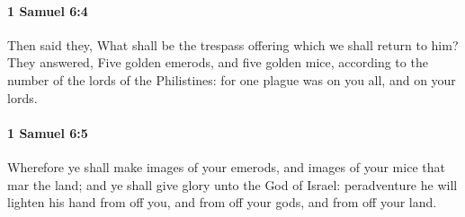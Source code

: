 		\paragraph{1 Samuel 6:4} %
			\label{1SAMUEL-6-4}

			Then said they, What shall be the trespass offering which we shall return to him? They answered, Five golden emerods, and five golden mice, according to the number of the lords of the Philistines: for one plague was on you all, and on your lords.


		\paragraph{1 Samuel 6:5} %
			\label{1SAMUEL-6-5}

			Wherefore ye shall make images of your emerods, and images of your mice that mar the land; and ye shall give glory unto the God of Israel: peradventure he will lighten his hand from off you, and from off your gods, and from off your land.

